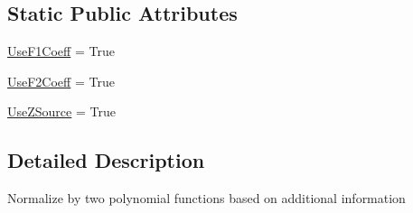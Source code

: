 \subsection*{Static Public Attributes}
\begin{DoxyCompactItemize}
\item 
\hyperlink{classsoftware_1_1chipwhisperer_1_1analyzer_1_1preprocessing_1_1Normalize_1_1NormMeanStd_1_1NormLinFunc_aab31c51b0e6192db93cf98c114b76e37}{Use\+F1\+Coeff} = True
\item 
\hyperlink{classsoftware_1_1chipwhisperer_1_1analyzer_1_1preprocessing_1_1Normalize_1_1NormMeanStd_1_1NormLinFunc_ad5c5d9460f9afbb897c99ecb4c88e9b9}{Use\+F2\+Coeff} = True
\item 
\hyperlink{classsoftware_1_1chipwhisperer_1_1analyzer_1_1preprocessing_1_1Normalize_1_1NormMeanStd_1_1NormLinFunc_a85e74de629bb70f21dddfc8ea0bf7df9}{Use\+Z\+Source} = True
\end{DoxyCompactItemize}


\subsection{Detailed Description}
\begin{DoxyVerb}Normalize by two polynomial functions based on additional information\end{DoxyVerb}
 

